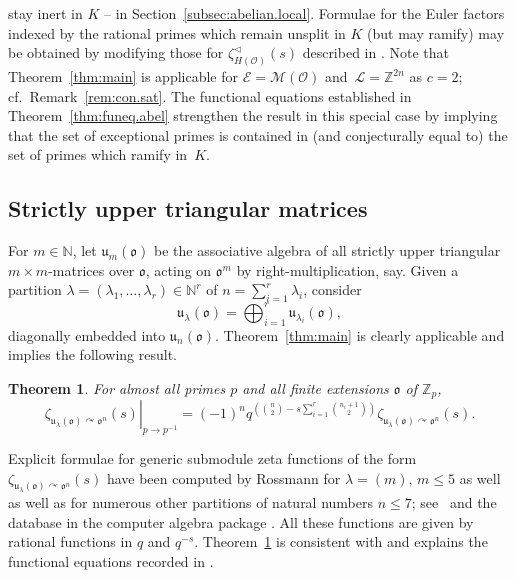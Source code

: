 \documentclass[11pt]{amsart}
\numberwithin{equation}{section}
\numberwithin{figure}{section}
\theoremstyle{plain}
\newtheorem{theorem}{Theorem}[section]
\theoremstyle{definition}
\theoremstyle{remark}
\begin{document}
stay inert in $K$ -- in Section~\ref{subsec:abelian.local}. Formulae
for the Euler factors indexed by the rational primes which remain
unsplit in $K$ (but may ramify) may be obtained by modifying those for
$\zeta^{\triangleleft}_{H({\ensuremath{\mathcal{O}}})}(s)$ described in \cite{SV2/14}. Note that
Theorem~\ref{thm:main} is applicable for ${\mathcal{E}} = {\mathcal{M}}({\ensuremath{\mathcal{O}}})$ and~${\ensuremath{\mathcal{L}}}
= {\ensuremath{\mathbb{Z}}}^{2n}$ as $c=2$; cf.\ Remark~\ref{rem:con.sat}. The functional
equations established in Theorem~\ref{thm:funeq.abel} strengthen the
result in this special case by implying that the set of exceptional
primes is contained in (and conjecturally equal to) the set of primes
which ramify in~$K$.

\subsection{Strictly upper triangular matrices}\label{sec:sut} 
For $m\in{\ensuremath{\mathbb{N}}}$, let ${\ensuremath{\mathfrak{u}}}_m({\mathfrak o})$ be the associative algebra of all
strictly upper triangular $m\times m$-matrices over ${\mathfrak o}$, acting on
${\mathfrak o}^m$ by right-multiplication, say. Given a partition
$\lambda=(\lambda_1,\dots,\lambda_r)\in{\ensuremath{\mathbb{N}}}^r$ of
$n=\sum_{i=1}^r\lambda_i$, consider
$${\ensuremath{\mathfrak{u}}}_{\lambda}({\mathfrak o})=\bigoplus_{i=1}^r {\ensuremath{\mathfrak{u}}}_{\lambda_i}({\mathfrak o}),$$
diagonally embedded into ${\ensuremath{\mathfrak{u}}}_{n}({\mathfrak o})$. Theorem~\ref{thm:main} is
clearly applicable and implies the following result.

\begin{theorem}\label{thm:funeq.u}
For almost all primes $p$ and all finite extensions ${\mathfrak o}$ of ${\ensuremath{\mathbb{Z}_p}}$,
$$
\left.\zeta_{{\ensuremath{\mathfrak{u}}}_{\lambda}({\mathfrak o}){\curvearrowright}{\mathfrak o}^n}(s)\right|_{p{\rightarrow} p^{-1}}
= (-1)^n q^{\left(\binom{n}{2} - s\sum_{i=1}^r
    \binom{n_i+1}{2}\right)}
\zeta_{{\ensuremath{\mathfrak{u}}}_{\lambda}({\mathfrak o}){\curvearrowright}{\mathfrak o}^n}(s).$$
\end{theorem}

Explicit formulae for generic submodule zeta functions of the form
$\zeta_{{\ensuremath{\mathfrak{u}}}_{\lambda}({\mathfrak o}){\curvearrowright}{\mathfrak o}^n}(s)$ have been computed by
Rossmann for $\lambda=(m)$, $m\leq 5$ as well as well as for numerous
other partitions of natural numbers $n\leq 7$;
see~\cite[Section~9.4]{Rossmann/16} and the database in the computer
algebra package \cite{Rossmannzeta}. All these functions are given by
rational functions in $q$ and $q^{-s}$. Theorem~\ref{thm:funeq.u} is
consistent with and explains the functional equations recorded in
\cite[Theorems~9.5, 9.8, 9.9]{Rossmann/16}.
\end{document}
